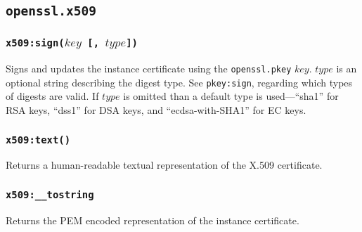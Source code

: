 \documentclass[11pt, oneside]{memoir}
\newcommand*{\fn}[1]{\texttt{#1}\xspace}
\newcommand*{\module}[1]{\texttt{#1}\xspace}
\newcounter{toccols}
\newenvironment{Module}[1]{
	\subsection{\texttt{#1}}
	\addtocontents{toc}{
		\protect\begin{multicols}{\value{toccols}}
	}
}{
	\addtocontents{toc}{\protect\end{multicols}}
}
\begin{document}
\begin{Module}{openssl.x509}
\subsubsection[\fn{x509:sign}]{\fn{x509:sign($key$ [, $type$])}}

Signs and updates the instance certificate using the \module{openssl.pkey} $key$. $type$ is an optional string describing the digest type. See \module{pkey:sign}, regarding which types of digests are valid. If $type$ is omitted than a default type is used---``sha1'' for RSA keys, ``dss1'' for DSA keys, and ``ecdsa-with-SHA1'' for EC keys.

\subsubsection[\fn{x509:text}]{\fn{x509:text()}}

Returns a human-readable textual representation of the X.509 certificate.

\subsubsection[\fn{x509:\_\_tostring}]{\fn{x509:\_\_tostring}}

Returns the PEM encoded representation of the instance certificate.

\end{Module}
\end{document}
